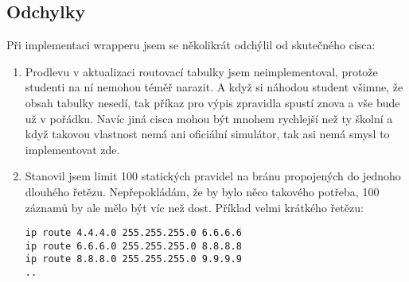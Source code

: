\subsection{Odchylky}
Při implementaci wrapperu jsem se několikrát odchýlil od skutečného cisca:

\begin{enumerate}
 \item Prodlevu v aktualizaci routovací tabulky jsem neimplementoval, protože studenti na ní nemohou téměř narazit. A když si náhodou student všimne, že obsah tabulky nesedí, tak příkaz pro výpis zpravidla spustí znova a vše bude už v pořádku. Navíc jiná cisca mohou být mnohem rychlejší než ty školní a když takovou vlastnost nemá ani oficiální simulátor, tak asi nemá smysl to implementovat zde.

 \item Stanovil jsem limit 100 statických pravidel na bránu propojených do jednoho dlouhého řetězu. Nepřepokládám, že by bylo něco takového potřeba, 100 záznamů by ale mělo být víc než dost. Příklad velmi krátkého řetězu:
\begin{verbatim}
ip route 4.4.4.0 255.255.255.0 6.6.6.6
ip route 6.6.6.0 255.255.255.0 8.8.8.8
ip route 8.8.8.0 255.255.255.0 9.9.9.9
..
\end{verbatim} 


\end{enumerate}


